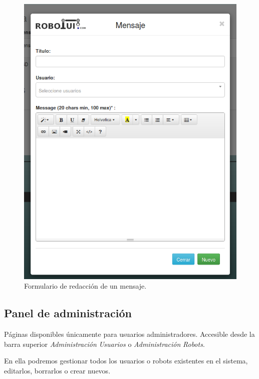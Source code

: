 \begin{figure}[H]
  \begin{center}
    \includegraphics[scale=.35]{imagenes/manual-usuario/formulario-mensaje.png}
  \end{center}
  \caption{ Formulario de redacción de un mensaje.}
  \label{website:formulario-mensaje}
\end{figure}


\subsection{Panel de administración}


Páginas disponibles únicamente para usuarios administradores. Accesible desde la barra superior \emph{Administración}  \textrightarrow \enspace  \emph{Usuarios} o \emph{Administración}  \textrightarrow \enspace  \emph{Robots}.

En ella podremos gestionar todos los usuarios o robots existentes en el sistema, editarlos, borrarlos o crear nuevos.\\


